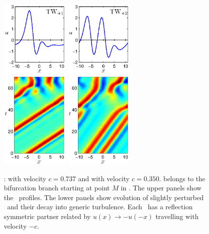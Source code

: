 \begin{figure}[t]
\begin{center}
\includegraphics[width=0.3\textwidth]{figs/ks22_TW1_profile.eps}
\includegraphics[width=0.3\textwidth]{figs/ks22_TW2_profile.eps}\\
\includegraphics[width=0.3\textwidth]{figs/ks22_TW1_orbit_c.eps}
\includegraphics[width=0.3\textwidth]{figs/ks22_TW2_orbit_c.eps}
\end{center}
\caption{
\Reqva :  with velocity $c = 0.737$ and  with
velocity $c = 0.350$.
 belongs to the bifurcation branch starting
at point $M$ in .
The upper panels show the \reqva\ profiles.  The lower panels show
evolution of slightly perturbed \reqva\ and their decay into generic
turbulence. Each \reqv\ has a reflection symmetric partner related by
$u(x) \to -u(-x)$ travelling with velocity $-c$.
} \label{f:ks22TW}
\end{figure}

